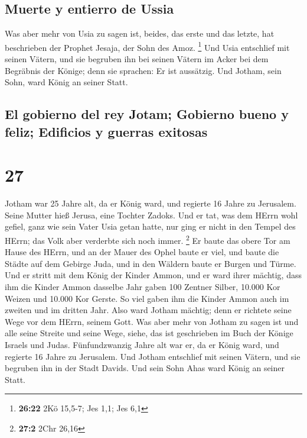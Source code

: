 \hypertarget{muerte-y-entierro-de-ussia}{%
\subsection{Muerte y entierro de
Ussia}\label{muerte-y-entierro-de-ussia}}

 Was aber mehr von Usia zu sagen ist, beides, das erste
und das letzte, hat beschrieben der Prophet Jesaja, der Sohn des Amoz.
\footnote{\textbf{26:22} 2Kö 15,5-7; Jes 1,1; Jes 6,1} 
Und Usia entschlief mit seinen Vätern, und sie begruben ihn bei seinen
Vätern im Acker bei dem Begräbnis der Könige; denn sie sprachen: Er ist
aussätzig. Und Jotham, sein Sohn, ward König an seiner Statt.

\hypertarget{el-gobierno-del-rey-jotam-gobierno-bueno-y-feliz-edificios-y-guerras-exitosas}{%
\subsection{El gobierno del rey Jotam; Gobierno bueno y feliz; Edificios
y guerras
exitosas}\label{el-gobierno-del-rey-jotam-gobierno-bueno-y-feliz-edificios-y-guerras-exitosas}}

\hypertarget{section-26}{%
\section{27}\label{section-26}}

 Jotham war 25 Jahre alt, da er König ward, und regierte
16 Jahre zu Jerusalem. Seine Mutter hieß Jerusa, eine Tochter Zadoks.
 Und er tat, was dem HErrn wohl gefiel, ganz wie sein
Vater Usia getan hatte, nur ging er nicht in den Tempel des HErrn; das
Volk aber verderbte sich noch immer. \footnote{\textbf{27:2} 2Chr 26,16}
 Er baute das obere Tor am Hause des HErrn, und an der
Mauer des Ophel baute er viel,  und baute die Städte auf
dem Gebirge Juda, und in den Wäldern baute er Burgen und Türme.
 Und er stritt mit dem König der Kinder Ammon, und er ward
ihrer mächtig, dass ihm die Kinder Ammon dasselbe Jahr gaben 100 Zentner
Silber, 10.000 Kor Weizen und 10.000 Kor Gerste. So viel gaben ihm die
Kinder Ammon auch im zweiten und im dritten Jahr.  Also
ward Jotham mächtig; denn er richtete seine Wege vor dem HErrn, seinem
Gott.  Was aber mehr von Jotham zu sagen ist und alle
seine Streite und seine Wege, siehe, das ist geschrieben im Buch der
Könige Israels und Judas.  Fünfundzwanzig Jahre alt war
er, da er König ward, und regierte 16 Jahre zu Jerusalem. 
Und Jotham entschlief mit seinen Vätern, und sie begruben ihn in der
Stadt Davids. Und sein Sohn Ahas ward König an seiner Statt.

